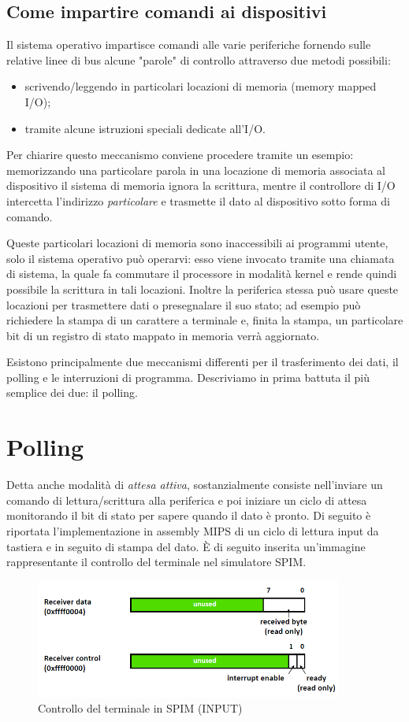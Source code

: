 \documentclass[class=book, crop=false, oneside]{standalone}
\begin{document}
\subsection{Come impartire comandi ai dispositivi}
Il sistema operativo impartisce comandi alle varie periferiche fornendo sulle relative linee di bus alcune "parole" di controllo attraverso due metodi possibili:
\begin{itemize}
	\item scrivendo/leggendo in particolari locazioni di memoria (memory mapped I/O);
	\item tramite alcune istruzioni speciali dedicate all'I/O.
\end{itemize}
Per chiarire questo meccanismo conviene procedere tramite un esempio:
memorizzando una particolare parola in una locazione di memoria associata al dispositivo il sistema di memoria ignora la scrittura, mentre il controllore di I/O intercetta l'indirizzo \emph{particolare} e trasmette il dato al dispositivo sotto forma di comando.

Queste particolari locazioni di memoria sono inaccessibili ai programmi utente, solo il sistema operativo può operarvi: esso viene invocato tramite una chiamata di sistema, la quale fa commutare il processore in modalità kernel e rende quindi possibile la scrittura in tali locazioni. Inoltre la periferica stessa può usare queste locazioni per trasmettere dati o presegnalare il suo stato; ad esempio può richiedere la stampa di un carattere a terminale e, finita la stampa, un particolare bit di un registro di stato mappato in memoria verrà aggiornato.

Esistono principalmente due meccanismi differenti per il trasferimento dei dati, il polling e le interruzioni di programma. Descriviamo in prima battuta il più semplice dei due: il polling.

\section{Polling}
Detta anche modalità di \emph{attesa attiva}, sostanzialmente consiste nell'inviare un comando di lettura/scrittura alla periferica e poi iniziare un ciclo di attesa monitorando il bit di stato per sapere quando il dato è pronto. Di seguito è riportata l'implementazione in assembly MIPS di un ciclo di lettura input da tastiera e in seguito di stampa del dato. È di seguito inserita un'immagine rappresentante il controllo del terminale nel simulatore SPIM.
\begin{figure}[!h]
	\centering
	\includegraphics[width=0.9\textwidth,keepaspectratio]{SPIM1}
	\caption{Controllo del terminale in SPIM (INPUT)}
\end{figure}
\end{document}
